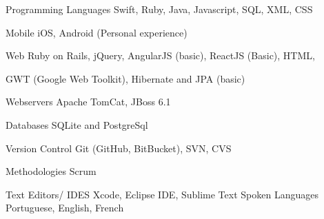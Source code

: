 

\begin{cvskills}
	
	\cvskill
	{Programming Languages} %
	{Swift, Ruby, Java, Javascript, SQL, XML, CSS} %
	
	\cvskill
	{Mobile} %
	{iOS, Android (Personal experience) } %
	
	\cvskill
	{Web} %
	{Ruby on Rails, jQuery, AngularJS (basic), ReactJS (Basic), HTML,}
	
	\cvskill
	{} %
	{GWT (Google Web Toolkit), Hibernate and JPA (basic) }
	
	\cvskill
	{Webservers} %
	{Apache TomCat, JBoss 6.1} %
	
	\cvskill
	{Databases}
	{SQLite and PostgreSql}
	
	\cvskill
	{Version Control}
	{Git (GitHub, BitBucket), SVN, CVS}
	
	\cvskill
	{Methodologies}
	{Scrum}
	
	\cvskill
	{Text Editors/ IDES}
	{Xcode, Eclipse IDE, Sublime Text}
	\cvskill
	{Spoken Languages} %
	{Portuguese, English, French} %
	
\end{cvskills}
